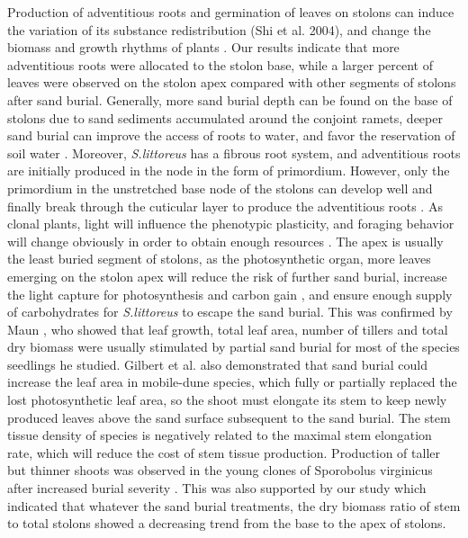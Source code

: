 \documentclass[]{interact}
\theoremstyle{plain}%
\theoremstyle{definition}
\theoremstyle{remark}
\begin{document}
Production of adventitious roots and germination of leaves on stolons can induce the variation of its substance redistribution (Shi et al. 2004), and change the biomass and growth rhythms of plants \citep{martinezResponsesDuneMosses1999,dechAdventitiousRootProduction2006}. 
Our results indicate that more adventitious roots were allocated to the stolon base, while a larger percent of leaves were observed on the stolon apex compared with other segments of stolons after sand burial. Generally, more sand burial depth can be found on the base of stolons due to sand sediments accumulated around the conjoint ramets, deeper sand burial can improve the access of roots to water, and favor the reservation of soil water \citep{yuanEffectsSandAccretion1993}. Moreover, \textit{S.littoreus} has a fibrous root system, and adventitious roots are initially produced in the node in the form of primordium. However, only the primordium in the unstretched base node of the stolons can develop well and finally break through the cuticular layer to produce the adventitious roots \citep{hochholdingerWeedsCropsGenetic2004}. 
As clonal plants, light will influence the phenotypic plasticity, and foraging behavior will change obviously in order to obtain enough resources \citep{fuResponsesGrasslandHerbaceous2013}. 
The apex is usually the least buried segment of stolons, as the photosynthetic organ, more leaves emerging on the stolon apex will reduce the risk of further sand burial, increase the light capture for photosynthesis and carbon gain \citep{yuanEffectsSandAccretion1993,shiEffectsSandBurial2004,brownMechanismsSurvivingBurial2018}, and ensure enough supply of carbohydrates for \textit{S.littoreus} to escape the sand burial. This was confirmed by Maun \citet{maunAdaptationsEnhancingSurvival1994}, who showed that leaf growth, total leaf area, number of tillers and total dry biomass were usually stimulated by partial sand burial for most of the species seedlings he studied. Gilbert et al. \citet{gilbertGrowthResponsesCoastal2008} also demonstrated that sand burial could increase the leaf area in mobile-dune species, which fully or partially replaced the lost photosynthetic leaf area, so the shoot must elongate its stem to keep newly produced leaves above the sand surface subsequent to the sand burial. The stem tissue density of species is negatively related to the maximal stem elongation rate, which will reduce the cost of stem tissue production. Production of taller but thinner shoots was observed in the young clones of Sporobolus virginicus after increased burial severity \citep{frosiniGlobalChangeResponse2012}. This was also supported by our study which indicated that whatever the sand burial treatments, the dry biomass ratio of stem to total stolons showed a decreasing trend from the base to the apex of stolons. 
\end{document}
